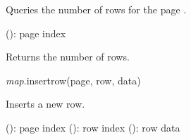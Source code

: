 \documentclass[a4paper,12pt,twoside,extrafontsizes]{memoir}
\begin{document}
\begin{funcdescr}
	Queries the number of rows for the page .
\end{funcdescr}

\begin{funcparams}
	 (): page index
\end{funcparams}

\begin{funcret}
	Returns the number of rows.
\end{funcret}


\begin{luafuncprototype}
\emph{map}.insertrow(page, row, data)
\end{luafuncprototype}

\begin{funcdescr}
	Inserts a new row.
\end{funcdescr}

\begin{funcparams}
	 (): page index
	 (): row index
	 (): row data
\end{funcparams}
\end{document}
